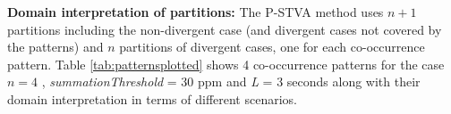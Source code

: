 \documentclass[letterpaper]{article} %
\begin{document}

\vspace{-10pt}
\textbf{Domain interpretation of partitions:} The P-STVA method uses $n+1$ partitions including the non-divergent case (and divergent cases not covered by the patterns) and $n$ partitions of divergent cases, one for each co-occurrence pattern. Table \ref{tab:patternsplotted} shows 4 co-occurrence patterns for the case $n=4$ , \textit{summationThreshold} = 30 ppm and \textit{L} = 3 seconds along with their domain interpretation in terms of different scenarios. 
\end{document}
